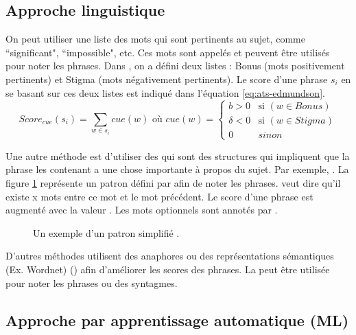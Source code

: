 \documentclass{KodeBook}
\begin{document}
\subsection{Approche linguistique}

On peut utiliser une liste des mots qui sont pertinents au sujet, comme ``significant", ``impossible", etc. 
Ces mots sont appelés  et peuvent être utilisés pour noter les phrases. 
Dans \cite{69-edmundson}, on a défini deux listes : Bonus (mots positivement pertinents) et Stigma (mots négativement pertinents).
Le score d'une phrase $s_i$ en se basant sur ces deux listes est indiqué dans l'équation \ref{eq:ats-edmundson}.
\begin{equation}\label{eq:ats-edmundson}
Score_{cue}(s_i) = \sum_{w \in s_i}{cue(w)}
\text{ où }
cue(w) = \left\lbrace 
\begin{array}{ll}
b > 0 & \text{si } (w \in Bonus) \\
\delta < 0 & \text{si } (w \in Stigma) \\
0 & sinon 
\end{array} 
\right. 
\end{equation}

Une autre méthode est d'utiliser des  qui sont des structures qui impliquent que la phrase les contenant a une chose importante à propos du sujet.
Par exemple, . 
La figure \ref{fig:paice-template} représente un patron défini par \cite{81-paice} afin de noter les phrases. 
\keyword{[x]} veut dire qu'il existe x mots entre ce mot et le mot précédent. 
Le score d'une phrase est augmenté avec la valeur .
Les mots optionnels sont annotés par .

\begin{figure}[!ht]
	\centering
	\caption{Un exemple d'un patron simplifié \cite{81-paice}.}
	\label{fig:paice-template}
\end{figure}

D'autres méthodes utilisent des anaphores ou des représentations sémantiques (Ex. Wordnet) () afin d'améliorer les scores des phrases. 
La  peut être utilisée pour noter les phrases ou des syntagmes.


\subsection{Approche par apprentissage automatique (ML)}
\end{document}
